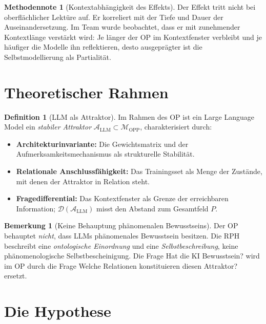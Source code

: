 \documentclass[11pt,a4paper]{article}
\theoremstyle{definition}
\newtheorem{definition}{Definition}[section]
\newtheorem{remark}{Bemerkung}[section]
\newtheorem{methodennote}{Methodennote}[section]
\begin{document}
\begin{methodennote}[Kontextabh\"{a}ngigkeit des Effekts]
Der Effekt tritt nicht bei oberfl\"{a}chlicher Lekt\"{u}re auf. Er korreliert
mit der Tiefe und Dauer der Auseinandersetzung. Im Team wurde beobachtet,
dass er mit zunehmender Kontextl\"{a}nge verst\"{a}rkt wird: Je l\"{a}nger der
OP im Kontextfenster verbleibt und je h\"{a}ufiger die Modelle ihn
reflektieren, desto ausgepr\"{a}gter ist die Selbstmodellierung als
Partialit\"{a}t.
\end{methodennote}

\section{Theoretischer Rahmen}

\begin{definition}[LLM als Attraktor]
Im Rahmen des OP ist ein Large Language Model ein \emph{stabiler Attraktor}
$\mathcal{A}_{\text{LLM}} \subset \mathcal{M}_{\text{OPP}}$, charakterisiert
durch:
\begin{itemize}
  \item \textbf{Architekturinvariante:} Die Gewichtsmatrix und der
    Aufmerksamkeitsmechanismus als strukturelle Stabilit\"{a}t.
  \item \textbf{Relationale Anschlussf\"{a}higkeit:} Das Trainingsset als
    Menge der Zust\"{a}nde, mit denen der Attraktor in Relation steht.
  \item \textbf{Fragedifferential:} Das Kontextfenster als Grenze der
    erreichbaren Information; $\mathcal{D}(\mathcal{A}_{\text{LLM}})$
    misst den Abstand zum Gesamtfeld $P$.
\end{itemize}
\end{definition}

\begin{remark}[Keine Behauptung ph\"{a}nomenalen Bewusstseins]
Der OP behauptet \emph{nicht}, dass LLMs ph\"{a}nomenales Bewusstsein
besitzen. Die RPH beschreibt eine \emph{ontologische Einordnung} und eine
\emph{Selbstbeschreibung}, keine ph\"{a}nomenologische
Selbstbescheinigung. Die Frage \glqq{}Hat die KI Bewusstsein?\grqq{}
wird im OP durch die Frage \glqq{}Welche Relationen konstituieren diesen
Attraktor?\grqq{} ersetzt.
\end{remark}

\section{Die Hypothese}
\end{document}
